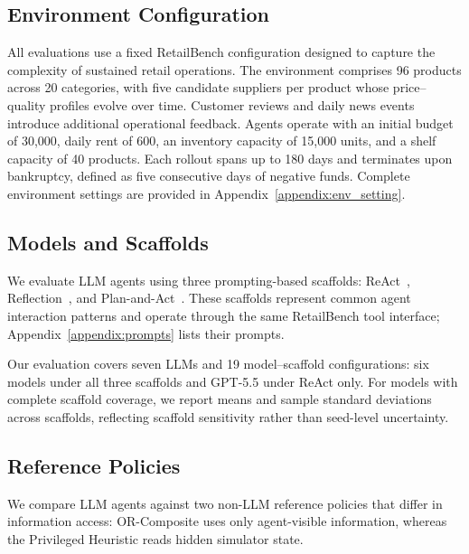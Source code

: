 \subsection{Environment Configuration}

All evaluations use a fixed RetailBench configuration designed to capture the complexity of sustained retail operations. The environment comprises 96 products across 20 categories, with five candidate suppliers per product whose price--quality profiles evolve over time. Customer reviews and daily news events introduce additional operational feedback. Agents operate with an initial budget of 30{,}000, daily rent of 600, an inventory capacity of 15{,}000 units, and a shelf capacity of 40 products. Each rollout spans up to 180 days and terminates upon bankruptcy,
defined as five consecutive days of negative funds. Complete environment settings are provided in Appendix~\ref{appendix:env_setting}.


\subsection{Models and Scaffolds}
\label{sec:models_frameworks}

We evaluate LLM agents using three prompting-based scaffolds: ReAct~\citep{yao2023react}, Reflection~\citep{reflection}, and Plan-and-Act~\citep{erdogan2025planandactimprovingplanningagents}. These scaffolds represent common agent interaction patterns and operate through the same RetailBench tool interface; Appendix~\ref{appendix:prompts} lists their prompts.

Our evaluation covers seven LLMs and 19 model--scaffold configurations: six models under all three scaffolds and GPT-5.5 under ReAct only. For models with complete scaffold coverage, we report means and sample standard deviations across scaffolds, reflecting scaffold sensitivity rather than seed-level uncertainty. 


\subsection{Reference Policies}
\label{sec:references}

We compare LLM agents against two non-LLM reference policies that differ in information access: OR-Composite uses only agent-visible information, whereas the Privileged Heuristic reads hidden simulator state.

